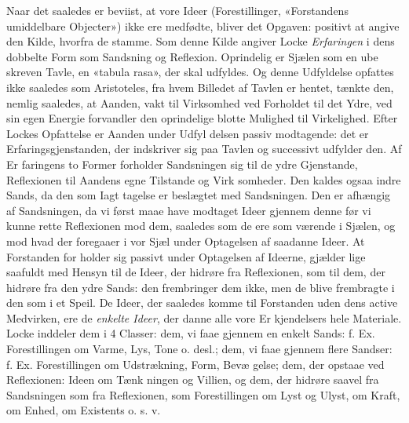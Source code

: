 \documentclass[12pt,a4paper]{book}
\begin{document}
Naar det saaledes er beviist, at vore Ideer (Forestillinger,
«Forstandens umiddelbare Objecter») ikke ere medfødte, bliver det
Opgaven: positivt at angive den Kilde, hvorfra de stamme. Som
denne Kilde angiver Locke \emph{Erfaringen} i dens dobbelte Form
som Sandsning og Reflexion. Oprindelig er Sjælen som en ube\-%
skreven Tavle, en «tabula rasa», der skal udfyldes. Og denne
Udfyldelse opfattes ikke saaledes som Aristoteles, fra hvem
Billedet af Tavlen er hentet, tænkte den, nemlig saaledes, at
Aanden, vakt til Virksomhed ved Forholdet til det Ydre, ved
sin egen Energie forvandler den oprindelige blotte Mulighed til
Virkelighed. Efter Lockes Opfattelse er Aanden under Udfyl\-%
delsen passiv modtagende: det er Erfaringsgjenstanden, der
indskriver sig paa Tavlen og successivt udfylder den. Af Er\-%
faringens to Former forholder Sandsningen sig til de ydre
Gjenstande, Reflexionen til Aandens egne Tilstande og Virk\-%
somheder. Den kaldes ogsaa indre Sands, da den som Iagt\-%
tagelse er beslægtet med Sandsningen. Den er afhængig af
Sandsningen, da vi først maae have modtaget Ideer gjennem
denne før vi kunne rette Reflexionen mod dem, saaledes som
de ere som værende i Sjælen, og mod hvad der foregaaer i vor
Sjæl under Optagelsen af saadanne Ideer. At Forstanden for\-%
holder sig passivt under Optagelsen af Ideerne, gjælder lige\-%
saafuldt med Hensyn til de Ideer, der hidrøre fra Reflexionen,
som til dem, der hidrøre fra den ydre Sands: den frembringer
dem ikke, men de blive frembragte i den som i et Speil.
De Ideer, der saaledes komme til Forstanden uden dens active
Medvirken, ere de \emph{enkelte Ideer}, der danne alle vore Er\-%
kjendelsers hele Materiale. Locke inddeler dem i 4 Classer:
dem, vi faae gjennem en enkelt Sands: f. Ex. Forestillingen
om Varme, Lys, Tone o. desl.; dem, vi faae gjennem flere
Sandser: f. Ex. Forestillingen om Udstrækning, Form, Bevæ\-%
gelse; dem, der opstaae ved Reflexionen: Ideen om Tænk\-%
ningen og Villien, og dem, der hidrøre saavel fra Sandsningen
som fra Reflexionen, som Forestillingen om Lyst og Ulyst, om
Kraft, om Enhed, om Existents o. s. v.
\end{document}
